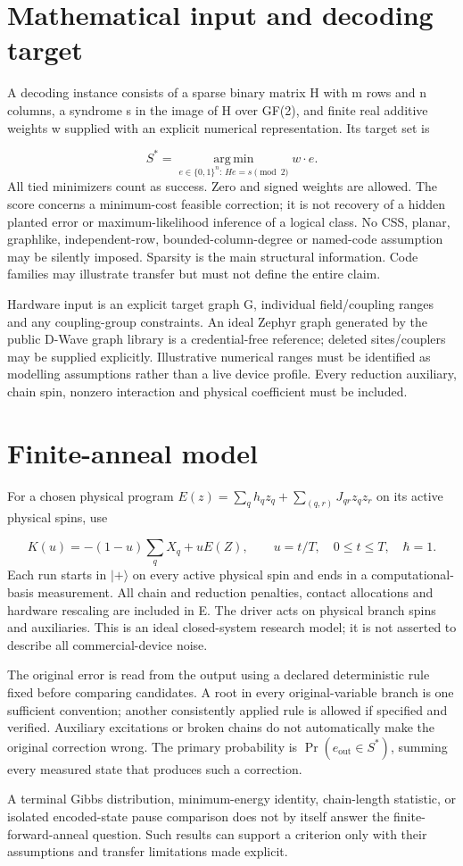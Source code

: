 \documentclass[11pt,letterpaper]{article}
\begin{document}
\section{Mathematical input and decoding target}
A decoding instance consists of a sparse binary matrix H with m rows and n columns, a syndrome s in the image of H over GF(2), and finite real additive weights w supplied with an explicit numerical representation. Its target set is\par
\[S^*=\operatorname*{arg\,min}_{e\in\{0,1\}^n:\,He=s\pmod2}w\cdot e.\]
All tied minimizers count as success. Zero and signed weights are allowed. The score concerns a minimum-cost feasible correction; it is not recovery of a hidden planted error or maximum-likelihood inference of a logical class. No CSS, planar, graphlike, independent-row, bounded-column-degree or named-code assumption may be silently imposed. Sparsity is the main structural information. Code families may illustrate transfer but must not define the entire claim.\par
Hardware input is an explicit target graph G, individual field/coupling ranges and any coupling-group constraints. An ideal Zephyr graph generated by the public D-Wave graph library is a credential-free reference; deleted sites/couplers may be supplied explicitly. Illustrative numerical ranges must be identified as modelling assumptions rather than a live device profile. Every reduction auxiliary, chain spin, nonzero interaction and physical coefficient must be included.\par
{}
\section{Finite-anneal model}
For a chosen physical program $E(z)=\sum_q h_qz_q+\sum_{(q,r)}J_{qr}z_qz_r$ on its active physical spins, use\par
\[K(u)=-(1-u)\sum_qX_q+uE(Z),\qquad u=t/T,\quad 0\leq t\leq T,\quad\hbar=1.\]
Each run starts in $|+\rangle$ on every active physical spin and ends in a computational-basis measurement. All chain and reduction penalties, contact allocations and hardware rescaling are included in E. The driver acts on physical branch spins and auxiliaries. This is an ideal closed-system research model; it is not asserted to describe all commercial-device noise.\par
The original error is read from the output using a declared deterministic rule fixed before comparing candidates. A root in every original-variable branch is one sufficient convention; another consistently applied rule is allowed if specified and verified. Auxiliary excitations or broken chains do not automatically make the original correction wrong. The primary probability is $\Pr(e_{\mathrm{out}}\in S^*)$, summing every measured state that produces such a correction.\par
A terminal Gibbs distribution, minimum-energy identity, chain-length statistic, or isolated encoded-state pause comparison does not by itself answer the finite-forward-anneal question. Such results can support a criterion only with their assumptions and transfer limitations made explicit.\par
\end{document}
